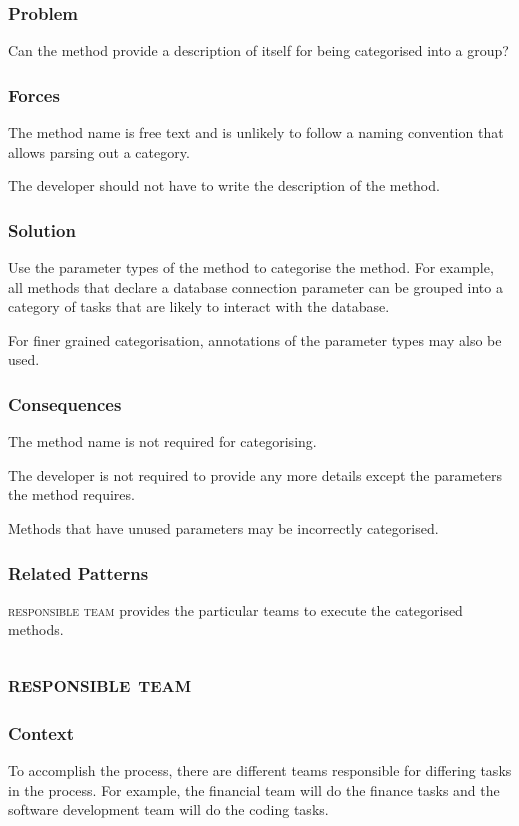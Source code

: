 \documentclass[prodmode]{style/acmlarge}
\begin{document}
\subsubsection*{Problem} Can the method provide a description of itself for being categorised into a group?

\subsubsection*{Forces} The method name is free text and is unlikely to follow a naming convention that
allows parsing out a category.

The developer should not have to write the description of the method.

\subsubsection*{Solution} Use the parameter types of the method to categorise
the method.  For example, all methods that declare a database connection
parameter can be grouped into a category of tasks that are likely to interact
with the database.

For finer grained categorisation, annotations of the parameter types may also be
used.

\subsubsection*{Consequences} The method name is not required for categorising.

The developer is not required to provide any more details except the parameters
the method requires.

Methods that have unused parameters may be incorrectly categorised.

\subsubsection*{Related Patterns}

\textsc{responsible team} provides the particular teams to execute the
categorised methods.



\subsection{\textsc{\textbf{responsible team}}}

\subsubsection*{Context} To accomplish the process, there are different teams
responsible for differing tasks in the process.  For example, the financial team
will do the finance tasks and the software development team will do the coding
tasks.
\end{document}
